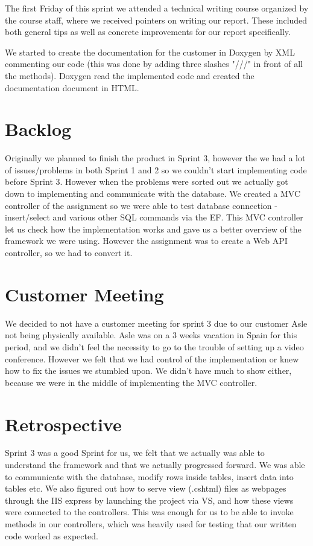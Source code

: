 The first Friday of this sprint we attended a technical writing course organized by the course staff, where we received pointers on writing our report. These included both general tips as well as concrete improvements for our report specifically.

We started to create the documentation for the customer in Doxygen by XML commenting our code (this was done by adding three slashes "///" in front of all the methods). Doxygen read the implemented code and created the documentation document in HTML. 

\section{Backlog}
Originally we planned to finish the product in Sprint 3, however the we had a lot of issues/problems in both Sprint 1 and 2 so we couldn't start implementing code before Sprint 3. However when the problems were sorted out we actually got down to implementing and communicate with the database. We created a MVC controller of the assignment so we were able to test database connection - insert/select and various other SQL commands via the EF. This MVC controller let us check how the implementation works and gave us a better overview of the framework we were using. However the assignment was to create a Web API controller, so we had to convert it.


\section{Customer Meeting}
We decided to not have a customer meeting for sprint 3 due to our customer Asle not being physically available. Asle was on a 3 weeks vacation in Spain for this period, and we didn't feel the necessity to go to the trouble of setting up a video conference.
However we felt that we had control of the implementation or knew how to fix the issues we stumbled upon. We didn't have much to show either, because we were in the middle of implementing the MVC controller.

\section{Retrospective}
Sprint 3 was a good Sprint for us, we felt that we actually was able to understand the framework and that we actually progressed forward. We was able to communicate with the database, modify rows inside tables, insert data into tables etc.
We also figured out how to serve view (.cshtml) files as webpages through the IIS express by launching the project via VS, and how these views were connected to the controllers. This was enough for us to be able to invoke methods in our controllers, which was heavily used for testing that our written code worked as expected.